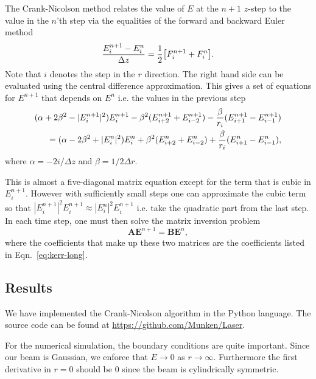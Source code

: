 The Crank-Nicolson method relates the value of $E$ at the $n+1$ $z$-step to the value in the
$n$'th step via the equalities of the forward and backward Euler method \begin{equation}
  \label{eq:Crank-Nicolson-discrete}
  \frac{E^{n+1}_{i} - E^{n}_{i}}{\Delta z} = \frac{1}{2} \big[F_{i}^{n+1}+F_{i}^{n} \big].
\end{equation}
Note that $i$ denotes the
step in the $r$ direction.
The right hand side can be evaluated using the central difference approximation. This gives
a set of equations for $E^{n+1}$ that depends on $E^{n}$ i.e. the values in the previous step
\begin{align}
  \notag
  (\alpha + 2\beta^{2} - |E_{i}^{n+1}|^{2})E_{i}^{n+1} - \beta^{2}(E_{i+2}^{n+1} + E_{i-2}^{n+1}) -
  \frac{\beta}{r_{i}} (E_{i+1}^{n+1} - E_{i-1}^{n+1}) \\
  = (\alpha - 2\beta^{2} + |E_{i}^{n}|^{2})E_{i}^{n} + \beta^{2}(E_{i+2}^{n} + E_{i-2}^{n}) +
  \frac{\beta}{r_{i}} (E_{i+1}^{n} - E_{i-1}^{n}), 
  \label{eq:kerr-long}
\end{align}
where $\alpha = -2i/\!{\Delta z}$ and $\beta = 1/{2 \Delta r}$.

This is almost a five-diagonal matrix equation except for the term that is cubic in
$E_{i}^{n+1}$. However with sufficiently small steps one can approximate the cubic term so that
$|E_{i}^{n+1}|^{2}E_{i}^{n+1} \approx |E_{i}^{n}|^{2}E_{i}^{n+1}$ i.e. take the quadratic part from
the last step. In each time step, one must then solve the matrix inversion problem
\begin{equation}
  \label{eq:matrix}
  \mathbf{A} \mathbf{E}^{n+1} = \mathbf{B} \mathbf{E}^{n}, 
\end{equation}
where the coefficients that make up these two matrices are the coefficients listed in
Eqn.~\eqref{eq:kerr-long}. 

\subsection{Results}
\label{sec:kerr-results}

We have implemented the Crank-Nicolson algorithm in the Python language. The source code can be found at
\url{https://github.com/Munken/Laser}.

For the numerical simulation, the boundary conditions are quite important. Since our beam is Gaussian,
we enforce that $E \rightarrow 0$ as $r \rightarrow \infty$.
Furthermore the first derivative in $r = 0$ should be 0 since the beam is cylindrically symmetric.

